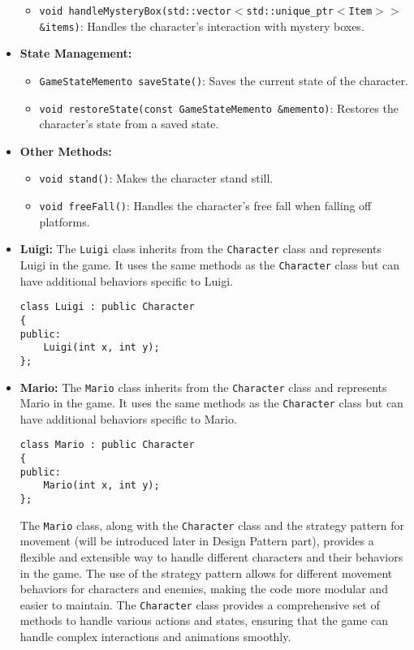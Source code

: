 \begin{itemize}
\begin{itemize}
        \item \texttt{void handleMysteryBox(std::vector$<$std::unique\_ptr$<$Item$>>$ \&items)}: Handles the character's interaction with mystery boxes.
    \end{itemize}
    \item \textbf{State Management:}
    \begin{itemize}
        \item \texttt{GameStateMemento saveState()}: Saves the current state of the character.
        \item \texttt{void restoreState(const GameStateMemento \&memento)}: Restores the character's state from a saved state.
    \end{itemize}
    \item \textbf{Other Methods:}
    \begin{itemize}
        \item \texttt{void stand()}: Makes the character stand still.
        \item \texttt{void freeFall()}: Handles the character's free fall when falling off platforms.
    \end{itemize}
    
\item \textbf{Luigi: }
The \texttt{Luigi} class inherits from the \texttt{Character} class and represents Luigi in the game. It uses the same methods as the \texttt{Character} class but can have additional behaviors specific to Luigi.
\begin{verbatim}
class Luigi : public Character
{
public:
    Luigi(int x, int y);
};
\end{verbatim}

\item \textbf{Mario: }
The \texttt{Mario} class inherits from the \texttt{Character} class and represents Mario in the game. It uses the same methods as the \texttt{Character} class but can have additional behaviors specific to Mario.
\begin{verbatim}
class Mario : public Character
{
public:
    Mario(int x, int y);
};
\end{verbatim}


The \texttt{Mario} class, along with the \texttt{Character} class and the strategy pattern for movement (will be introduced later in Design Pattern part), provides a flexible and extensible way to handle different characters and their behaviors in the game. The use of the strategy pattern allows for different movement behaviors for characters and enemies, making the code more modular and easier to maintain. The \texttt{Character} class provides a comprehensive set of methods to handle various actions and states, ensuring that the game can handle complex interactions and animations smoothly.
\end{itemize}